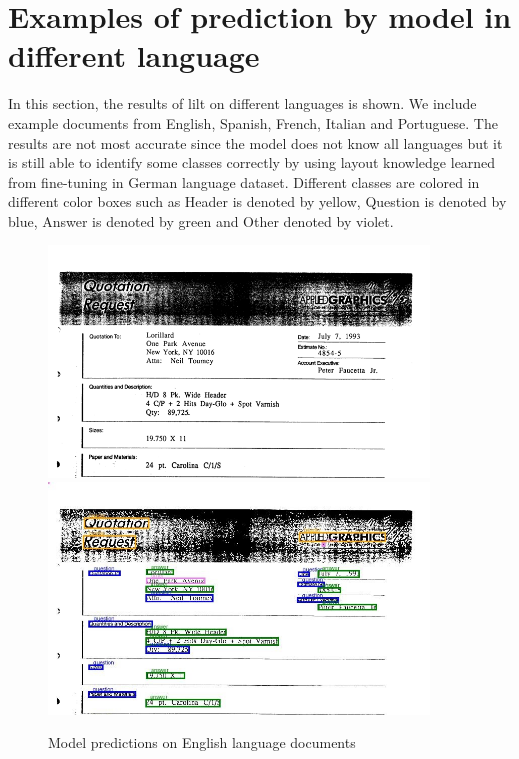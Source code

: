 \chapter{Examples of prediction by model in different language\label{results_languages}}
In this section, the results of \acrshort{lilt} on different languages is shown. We include example documents from English, Spanish, French, Italian and Portuguese. The results are not most accurate since the model does not know all languages but it is still able to identify some classes correctly by using layout knowledge learned from fine-tuning in German language dataset. Different classes are colored in different color boxes such as Header is denoted by yellow, Question is denoted by blue,  Answer is denoted by green and Other denoted by violet. 


\begin{figure}[!ht]
\centering
\includegraphics[width=0.9\textwidth]{chapters/images/experiments_and_results/original/88547278_88547279.png}\hfill
\includegraphics[width=0.9\textwidth]{chapters/images/experiments_and_results/results/88547278_88547279.png}
% 
\caption{Model predictions on English language documents}
    \label{fig:result_lang_en}
\end{figure}

